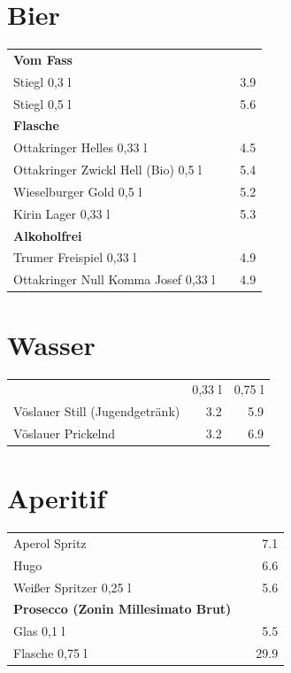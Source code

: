 \documentclass[a4paper,12pt]{article}
\begin{document}
\begin{multicols}{2}
\section*{Bier}
\begin{tabular}{Lrr}
\textbf{Vom Fass}\\
\hspace{0.4cm}Stiegl 0,3 l & & 3.9\\
\hspace{0.4cm}Stiegl 0,5 l & & 5.6\vspace{0.1cm}\\
\textbf{Flasche}\\
\hspace{0.4cm}Ottakringer Helles 0,33 l & & 4.5\\
\hspace{0.4cm}Ottakringer Zwickl Hell (Bio) 0,5 l & & 5.4\\
\hspace{0.4cm}Wieselburger Gold 0,5 l & & 5.2\\
\hspace{0.4cm}Kirin Lager 0,33 l & & 5.3\vspace{0.1cm}\\
\textbf{Alkoholfrei}\\
\hspace{0.4cm}Trumer Freispiel 0,33 l & & 4.9\\
\hspace{0.4cm}Ottakringer Null Komma Josef 0,33 l & & 4.9
\end{tabular}

\columnbreak
\section*{Wasser}
\begin{tabular}{Lrr}
& 0,33 l & 0,75 l\\
Vöslauer Still (Jugendgetränk) & 3.2 & 5.9\\
Vöslauer Prickelnd & 3.2 & 6.9
\end{tabular}

\section*{Aperitif}
\begin{tabular}{Lrr}
Aperol Spritz & & 7.1\\
Hugo & & 6.6\\
Weißer Spritzer 0,25 l & & 5.6\\
\textbf{Prosecco (Zonin Millesimato Brut)}\\
\hspace{0.4cm}Glas 0,1 l & & 5.5\\
\hspace{0.4cm}Flasche 0,75 l & & 29.9
\end{tabular}


\end{multicols}
\end{document}

